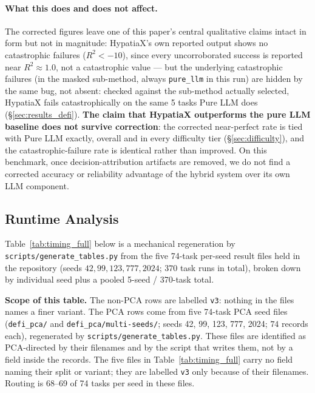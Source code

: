 \documentclass[twoside,11pt]{article}
\newcommand{\Rsq}{R^{2}}
\begin{document}
\paragraph{What this does and does not affect.} The corrected figures leave
one of this paper's central qualitative claims intact in form but not in
magnitude: HypatiaX's own reported output shows no catastrophic failures
($\Rsq < -10$), since every uncorroborated success is reported near
$\Rsq \approx 1.0$, not a catastrophic value --- but the underlying
catastrophic failures (in the masked sub-method, always \texttt{pure\_llm}
in this run) are hidden by the same bug, not absent: checked against the
sub-method actually selected, HypatiaX fails catastrophically on the same
5 tasks Pure LLM does (\S\ref{sec:results_defi}). \textbf{The claim that
HypatiaX outperforms the pure LLM baseline does not survive correction}:
the corrected near-perfect rate is tied with Pure LLM exactly, overall
and in every difficulty tier (\S\ref{sec:difficulty}), and the
catastrophic-failure rate is identical rather than improved. On this
benchmark, once decision-attribution artifacts are removed, we do not
find a corrected accuracy or reliability advantage of the hybrid system
over its own LLM component.

\subsection{Runtime Analysis}\label{subsec:runtime-analysis}
\label{sec:timing}

Table~\ref{tab:timing_full} below is a mechanical regeneration by \texttt{scripts/generate\_tables.py} from the five 74-task per-seed result files held in the repository (seeds $42, 99, 123, 777, 2024$; $370$ task runs in total), broken down by individual seed plus a pooled 5-seed / 370-task total.

\textbf{Scope of this table.} The non-PCA rows are labelled \texttt{v3}: nothing in the
files names a finer variant. The PCA rows come from five 74-task PCA seed files
(\texttt{defi\_pca/} and \texttt{defi\_pca/multi-seeds/}; seeds 42, 99, 123, 777, 2024;
$74$ records each), regenerated by \texttt{scripts/generate\_tables.py}. These files are
identified as PCA-directed by their filenames and by the script that writes them, not by a
field inside the records. The five files in Table~\ref{tab:timing_full} carry no field
naming their split or variant; they are labelled \texttt{v3} only because of their
filenames. Routing is 68--69 of 74 tasks per seed in these files.
\end{document}
